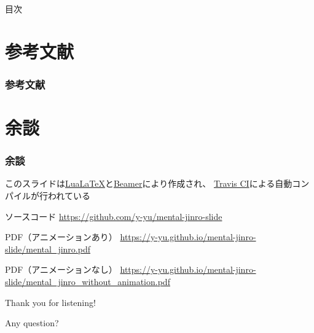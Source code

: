 \begin{frame}{目次}
  \tableofcontents
\end{frame}

\section*{参考文献}
\begin{frame}
  \frametitle{参考文献}

  \nocite{*}
  
  
\end{frame}

\section*{余談}
\begin{frame}
  \frametitle{余談}

  このスライドは\href{https://texwiki.texjp.org/?LuaTeX}{Lua\LaTeX}と\href{https://texwiki.texjp.org/?Beamer}{Beamer}により作成され、
  \href{https://travis-ci.org/}{Travis CI}による自動コンパイルが行われている

  \begin{Ldescription}
    \item[ソースコード]
      \url{https://github.com/y-yu/mental-jinro-slide}
    \item[PDF（アニメーションあり）]
      \url{https://y-yu.github.io/mental-jinro-slide/mental_jinro.pdf}
    \item[PDF（アニメーションなし）]
      \url{https://y-yu.github.io/mental-jinro-slide/mental_jinro_without_animation.pdf}
  \end{Ldescription}
\end{frame}


\begin{frame}
  \centering
  {\Huge Thank you for listening!}

  \quad

  {\Huge Any question?}
\end{frame}


